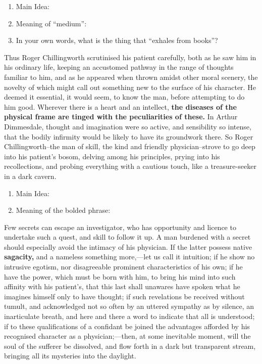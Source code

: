 \documentclass[12pt]{book}
\renewcommand{\indent}{\hspace{1cm}}
\begin{document}
\begin{enumerate}
\item Main Idea: \hrulefill
\item Meaning of ``medium'': \hrulefill
\item In your own words, what is the thing that ``exhales from books''? \hrulefill
\end{enumerate}

\begin{linenumbers}
\modulolinenumbers[5]
\indent Thus Roger Chillingworth scrutinised his patient carefully, both as he saw him in his ordinary life, keeping an accustomed pathway in the range of thoughts familiar to him, and as he appeared when thrown amidst other moral scenery, the novelty of which might call out something new to the surface of his character. He deemed it essential, it would seem, to know the man, before attempting to do him good. Wherever there is a heart and an intellect, \textbf{the diseases of the physical frame are tinged with the peculiarities of these.} In Arthur Dimmesdale, thought and imagination were so active, and sensibility so intense, that the bodily infirmity would be likely to have its groundwork there. So Roger Chillingworth--the man of skill, the kind and friendly physician--strove to go deep into his patient's bosom, delving among his principles, prying into his recollections, and probing everything with a cautious touch, like a treasure-seeker in a dark cavern.
\end{linenumbers}

\begin{enumerate}
\item Main Idea: \hrulefill
\item Meaning of the bolded phrase: \hrulefill
\end{enumerate}

\begin{linenumbers}
\modulolinenumbers[5]
\indent Few secrets can escape an investigator, who has opportunity and licence to undertake such a quest, and skill to follow it up. A man burdened with a secret should especially avoid the intimacy of his physician. If the latter possess native \textbf{sagacity,} and a nameless something more,—let us call it intuition; if he show no intrusive egotism, nor disagreeable prominent characteristics of his own; if he have the power, which must be born with him, to bring his mind into such affinity with his patient's, that this last shall unawares have spoken what he imagines himself only to have thought; if such revelations be received without tumult, and acknowledged not so often by an uttered sympathy as by silence, an inarticulate breath, and here and there a word to indicate that all is understood; if to these qualifications of a confidant be joined the advantages afforded by his recognised character as a physician;—then, at some inevitable moment, will the soul of the sufferer be dissolved, and flow forth in a dark but transparent stream, bringing all its mysteries into the daylight.
\end{linenumbers}
\end{document}
